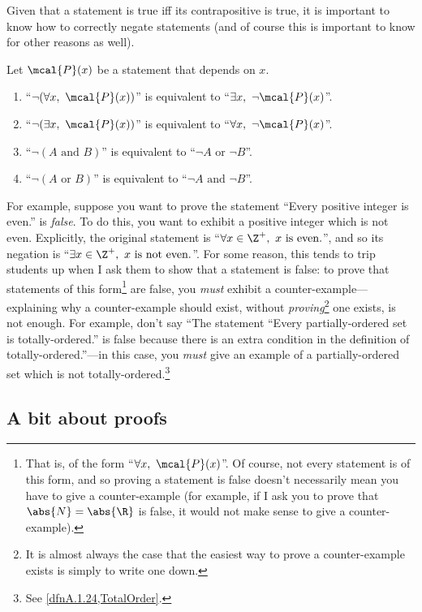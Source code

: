 Given that a statement is true iff its contrapositive is true, it is important to know how to correctly negate statements (and of course this is important to know for other reasons as well).
\begin{exm}{}{}
Let $\mcal{P}(x)$ be a statement that depends on $x$.
\begin{enumerate}
\item ``$\neg (\forall x,\ \mcal{P}(x))$'' is equivalent to ``$\exists x,\ \neg \mcal{P}(x)$''.
\item ``$\neg (\exists x,\ \mcal{P}(x))$'' is equivalent to ``$\forall x,\ \neg \mcal{P}(x)$''.
\item ``$\neg (A\text{ and }B)$'' is equivalent to ``$\neg A\text{ or }\neg B$''.
\item ``$\neg (A\text{ or }B)$'' is equivalent to ``$\neg A\text{ and }\neg B$''.
\end{enumerate}
\begin{rmk}
For example, suppose you want to prove the statement ``Every positive integer is even.'' is \emph{false}.  To do this, you want to exhibit a positive integer which is not even.  Explicitly, the original statement is ``$\forall x\in \Z ^+,\ x\text{ is even.}$'', and so its negation is ``$\exists x\in \Z ^+,\ x\text{ is not even.}$''.  For some reason, this tends to trip students up when I ask them to show that a statement is false:  to prove that statements of this form\footnote{That is, of the form ``$\forall x,\ \mcal{P}(x)$''.  Of course, not every statement is of this form, and so proving a statement is false doesn't necessarily mean you have to give a counter-example (for example, if I ask you to prove that $\abs{N}=\abs{\R}$ is false, it would not make sense to give a counter-example).} are false, you \emph{must} exhibit a counter-example---explaining why a counter-example should exist, without \emph{proving}\footnote{It is almost always the case that the easiest way to prove a counter-example exists is simply to write one down.} one exists, is not enough.  For example, don't say ``The statement ``Every partially-ordered set is totally-ordered.'' is false because there is an extra condition in the definition of totally-ordered.''---in this case, you \emph{must} give an example of a partially-ordered set which is not totally-ordered.\footnote{See \cref{dfnA.1.24,TotalOrder}.}
\end{rmk}
\end{exm}

\subsection{A bit about proofs}\label{sbsABitAboutProofs}

